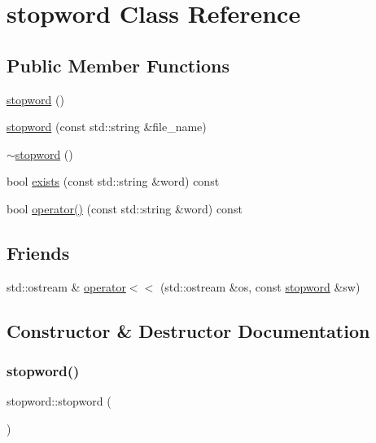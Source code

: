 \hypertarget{classstopword}{}\section{stopword Class Reference}
\label{classstopword}
\subsection*{Public Member Functions}
\begin{DoxyCompactItemize}
\item 
\hyperlink{classstopword_a27bd1c2cc2608cc3fef800a6e1c2edd6}{stopword} ()
\item 
\hyperlink{classstopword_accb49b6c9d5ddc75002348a869df5619}{stopword} (const std\+::string \&file\+\_\+name)
\item 
\hyperlink{classstopword_aee102291edf88348aad736a35c961fdf}{$\sim$stopword} ()
\item 
bool \hyperlink{classstopword_a11210085752c2b3d63055490c13b6666}{exists} (const std\+::string \&word) const
\item 
bool \hyperlink{classstopword_a0bee2c17bb62af157dae20b9242805aa}{operator()} (const std\+::string \&word) const
\end{DoxyCompactItemize}
\subsection*{Friends}
\begin{DoxyCompactItemize}
\item 
std\+::ostream \& \hyperlink{classstopword_a80e1d6c776f6a931100b5ea063e3a6ea}{operator$<$$<$} (std\+::ostream \&os, const \hyperlink{classstopword}{stopword} \&sw)
\end{DoxyCompactItemize}


\subsection{Constructor \& Destructor Documentation}
\mbox{\label{classstopword_a27bd1c2cc2608cc3fef800a6e1c2edd6}} 
\subsubsection{\texorpdfstring{stopword()}{stopword()}\hspace{0.1cm}{\footnotesize\ttfamily [1/2]}}
{\footnotesize\ttfamily stopword\+::stopword (\begin{DoxyParamCaption}{ }\end{DoxyParamCaption})}

